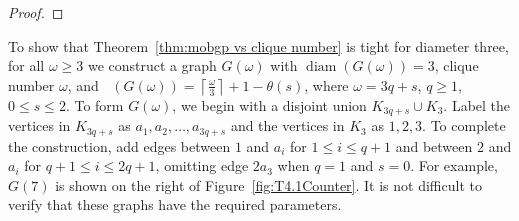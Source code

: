 \documentclass[a4paper,12pt]{article}
\DeclareMathOperator{\mob}{Mob_{gp}}
\DeclareMathOperator{\diam}{diam}
\theoremstyle{definition}
\begin{document}
\begin{proof}
	\end{proof}
	
	To show that Theorem~\ref{thm:mobgp vs clique number} is tight for diameter three, for all $\omega \geq 3$ we construct a graph $G(\omega )$ with $\diam (G(\omega )) = 3$, clique number $\omega $, and $\mob{(G(\omega ))} = \left \lceil \frac{\omega }{3} \right \rceil + 1 - \theta(s)$, where $\omega = 3q+s$, $q \geq 1$, $0 \leq s \leq 2$. To form $G(\omega )$, we begin with a disjoint union $K_{3q+s} \cup K_3$. Label the vertices in $K_{3q+s}$ as $a_1, a_2, \dots, a_{3q+s}$ and the vertices in $K_3$ as $1,2,3$. To complete the construction, add edges between $1$ and $a_i$ for $1 \leq i \leq q+1$ and between $2$ and $a_i$ for $q+1 \leq i \leq 2q+1$, omitting edge $2a_3$ when $q=1$ and $s=0$. For example, $G(7)$ is shown on the right of Figure~\ref{fig:T4.1Counter}. It is not difficult to verify that these graphs have the required parameters.
	
\end{document}

